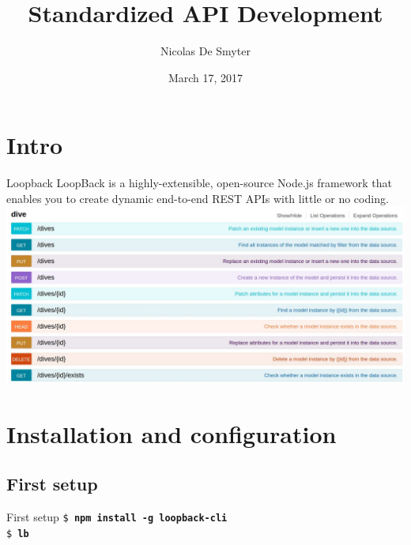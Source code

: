 \documentclass[11pt]{beamer}
\author{Nicolas De Smyter}
\title{Standardized API Development}
\institute{FDS}
\date{March 17, 2017}
\begin{document}
\begin{frame}
\titlepage
\end{frame}

\begin{frame}
\tableofcontents
\end{frame}

\section{Intro}
\begin{frame}{Loopback}
LoopBack is a highly-extensible, open-source Node.js framework that enables you to create dynamic end-to-end REST APIs with little or no coding.\\
\includegraphics[width=\textwidth]{images/explorer-overview.jpg} 
\end{frame}

\section{Installation and configuration}
\subsection{First setup}
\begin{frame}{First setup}
\texttt{\$ \textbf{npm install -g loopback-cli}}\\
\texttt{\$ \textbf{lb}}
\end{frame}
\end{document}
